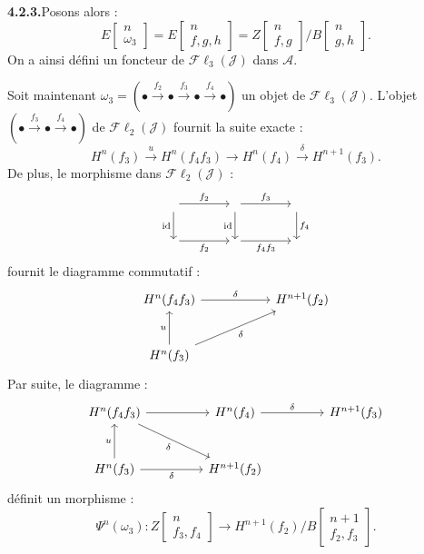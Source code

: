 \clearpage
{}%
\begingroup\small\setlength{\parskip}{0pt}\setlength{\emergencystretch}{1.5em}
\medskip\noindent\textbf{4.2.3.}\quad Posons alors :
\[
E\!\left[\begin{smallmatrix}n\\\omega_3\end{smallmatrix}\right]
=E\!\left[\begin{smallmatrix}n\\f,g,h\end{smallmatrix}\right]
=Z\!\left[\begin{smallmatrix}n\\f,g\end{smallmatrix}\right]
\big/
B\!\left[\begin{smallmatrix}n\\g,h\end{smallmatrix}\right].
\tag{4.2.3.1}
\]
On a ainsi défini un foncteur de $\mathcal{F}\ell_3(\mathcal J)$ dans
$\mathcal A$.

Soit maintenant
$\omega_3=(\mathord\bullet\xrightarrow{f_2}\mathord\bullet
\xrightarrow{f_3}\mathord\bullet\xrightarrow{f_4}\mathord\bullet)$
un objet de $\mathcal{F}\ell_3(\mathcal J)$. L'objet
$(\mathord\bullet\xrightarrow{f_3}\mathord\bullet\xrightarrow{f_4}\mathord\bullet)$
de $\mathcal{F}\ell_2(\mathcal J)$ fournit la suite exacte :
\[
H^n(f_3)\xrightarrow u H^n(f_4f_3)\longrightarrow H^n(f_4)
\xrightarrow\delta H^{n+1}(f_3).
\]
De plus, le morphisme dans $\mathcal{F}\ell_2(\mathcal J)$ :
\[
\begin{tikzcd}[column sep=4em,row sep=2.2em]
{}\arrow[r,"f_2"]\arrow[d,"\operatorname{id}"']&{}
 \arrow[r,"f_3"]\arrow[d,"\operatorname{id}"']&{}\arrow[d,"f_4"]\\
{}\arrow[r,"f_2"']&{}\arrow[r,"f_4f_3"']&{}
\end{tikzcd}
\]
fournit le diagramme commutatif :
\[
\begin{tikzcd}[column sep=5.5em,row sep=2.7em]
H^n(f_4f_3)\arrow[r,"\delta"]&H^{n+1}(f_2)\\
H^n(f_3)\arrow[u,"u"]\arrow[ur,"\delta"']&{}
\end{tikzcd}
\]
Par suite, le diagramme :
\[
\begin{tikzcd}[column sep=4.5em,row sep=2.7em]
H^n(f_4f_3)\arrow[r]\arrow[dr,"\delta"']&
H^n(f_4)\arrow[r,"\delta"]&H^{n+1}(f_3)\\
H^n(f_3)\arrow[u,"u"]\arrow[r,"\delta"']&H^{n+1}(f_2)&{}
\end{tikzcd}
\]
définit un morphisme :
\[
\Psi^n(\omega_3)\colon
Z\!\left[\begin{smallmatrix}n\\f_3,f_4\end{smallmatrix}\right]
\longrightarrow
H^{n+1}(f_2)\big/
B\!\left[\begin{smallmatrix}n+1\\f_2,f_3\end{smallmatrix}\right].
\]
\endgroup
